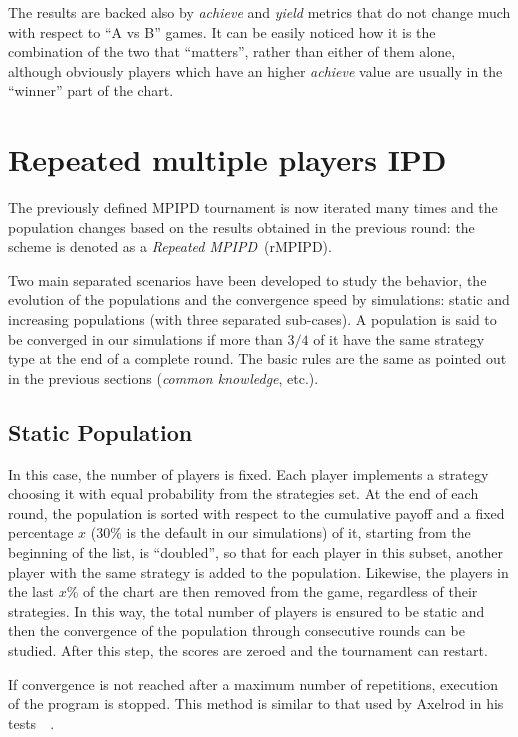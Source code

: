 \documentclass[journal,10pt,twoside]{IEEEtran}
\begin{document}
The results are backed also by \textit{achieve} and \textit{yield} metrics that do not change much with respect to ``A vs B'' games.
It can be easily noticed how it is the combination of the two that ``matters'', rather than either of them alone, although obviously players which have an higher \textit{achieve} value are usually in the ``winner'' part of the chart.

\section{Repeated multiple players IPD} \label{s:rIPDMP}
The previously defined MPIPD tournament is now iterated many times and the population changes based on the results obtained in the previous round: the scheme is denoted as a \textit{Repeated MPIPD}~(rMPIPD).

Two main separated scenarios have been developed to study the behavior, the evolution of the populations and the convergence speed by simulations: static and increasing populations (with three separated sub-cases). A population is said to be converged in our simulations if more than $3/4$ of it have the same strategy type at the end of a complete round. The basic rules are the same as pointed out in the previous sections (\textit{common knowledge},  etc.).

\subsection{Static Population} \label{ss:rIPDMPc}
In this case, the number of players is fixed. Each player implements a strategy choosing it with equal probability from the strategies set. At the end of each round, the population is sorted with respect to the cumulative payoff and a fixed percentage $x$ ($30\%$ is the default in our simulations) of it, starting from the beginning of the list, is ``doubled'', so that for each player in this subset, another player with the same strategy is added to the population. Likewise, the players in the last $x\%$ of the chart are then removed from the game, regardless of their strategies. In this way, the total number of players is ensured to be static and then the convergence of the population through consecutive rounds can be studied. After this step, the scores are zeroed and the tournament can restart.

If convergence is not reached after a maximum number of repetitions, execution of the program is stopped.
This method is similar to that used by Axelrod in his tests~\cite[\S 2.6]{mathieu2017}~\cite{axelrod1984evolution}.
\end{document}
